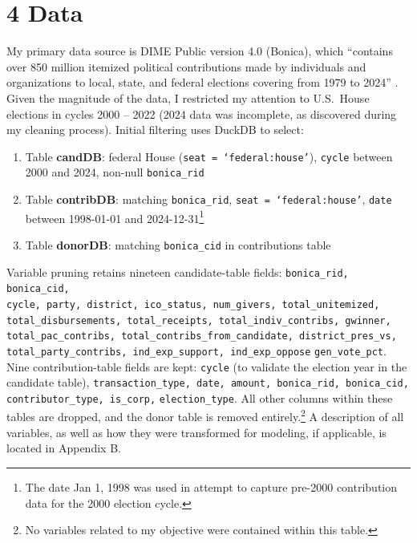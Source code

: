 \section*{4 Data}

\indent My primary data source is DIME Public version 4.0 (Bonica), which ``contains over 850 million itemized political contributions made by individuals and organizations to local, state, and federal elections covering from 1979 to 2024'' \cite{bonica2024}. Given the magnitude of the data, I restricted my attention to U.S.\ House elections in cycles 2000 -- 2022 (2024 data was incomplete, as discovered during my cleaning process). Initial filtering uses DuckDB to select:

\begin{enumerate}
	\item Table \textbf{candDB}: federal House (\texttt{seat = `federal:house'}), \texttt{cycle} between 2000 and 2024, non-null \texttt{bonica\_rid}
	\item Table \textbf{contribDB}: matching \texttt{bonica\_rid}, \texttt{seat = `federal:house'}, \texttt{date} between 1998-01-01 and 2024-12-31\footnote{The date Jan 1, 1998 was used in attempt to capture pre-2000 contribution data for the 2000 election cycle.}\
	\item Table \textbf{donorDB}: matching \texttt{bonica\_cid} in contributions table
\end{enumerate}

\indent Variable pruning retains nineteen candidate-table fields: \texttt{bonica\_rid, bonica\_cid, \\ cycle, party, district, ico\_status, num\_givers, total\_unitemized, \\ total\_disbursements, total\_receipts, total\_indiv\_contribs, gwinner, \\ total\_pac\_contribs, total\_contribs\_from\_candidate, district\_pres\_vs, \\ total\_party\_contribs, ind\_exp\_support, ind\_exp\_oppose}  \texttt{gen\_vote\_pct}. Nine contribution-table fields are kept: \texttt{cycle} (to validate the election year in the candidate table), \texttt{transaction\_type, date, amount, bonica\_rid, bonica\_cid, \\ contributor\_type, is\_corp,}  \texttt{election\_type}. All other columns within these tables are dropped, and the donor table is removed entirely.\footnote{No variables related to my objective were contained within this table.} A description of all variables, as well as how they were transformed for modeling, if applicable, is located in Appendix B.

